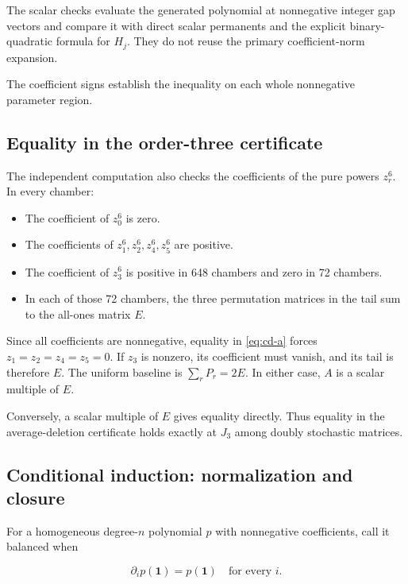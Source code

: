 \documentclass[11pt,a4paper]{article}
\providecommand{\tightlist}{\setlength{\itemsep}{0pt}\setlength{\parskip}{0pt}}
\theoremstyle{definition}
\theoremstyle{remark}
\begin{document}
The scalar checks evaluate the generated polynomial at nonnegative
integer gap vectors and compare it with direct scalar permanents and the
explicit binary-quadratic formula for \(H_j\). They do not reuse the
primary coefficient-norm expansion.

The coefficient signs establish the inequality on each whole nonnegative parameter region.

\subsection{Equality in the order-three
certificate}\label{deletion-equality-in-the-order-three-certificate}

The independent computation also checks the coefficients of the pure powers
\(z_r^6\). In every chamber:

\begin{itemize}
\tightlist
\item
  The coefficient of \(z_0^6\) is zero.
\item
  The coefficients of \(z_1^6,z_2^6,z_4^6,z_5^6\) are positive.
\item
  The coefficient of \(z_3^6\) is positive in 648 chambers and zero in
  72 chambers.
\item
  In each of those 72 chambers, the three permutation matrices in the
  tail sum to the all-ones matrix \(E\).
\end{itemize}

Since all coefficients are nonnegative, equality in \eqref{eq:cd-a} forces
\(z_1=z_2=z_4=z_5=0\). If \(z_3\) is nonzero, its coefficient must
vanish, and its tail is therefore \(E\). The uniform baseline is
\(\sum_rP_r=2E\). In either case, \(A\) is a scalar multiple of \(E\).

Conversely, a scalar multiple of \(E\) gives equality directly. Thus
equality in the average-deletion certificate holds exactly at \(J_3\)
among doubly stochastic matrices.

\subsection{Conditional induction: normalization and
closure}\label{deletion-conditional-induction-normalization-and-closure}

For a homogeneous degree-\(n\) polynomial \(p\) with nonnegative
coefficients, call it balanced when

\[
\partial_ip(\mathbf1)=p(\mathbf1)\quad\text{for every }i.
\]
\end{document}
